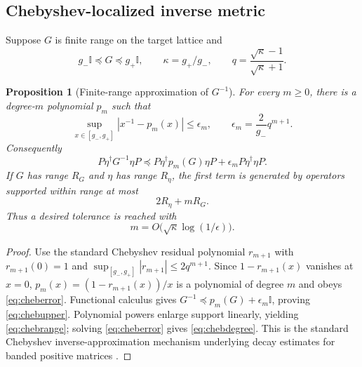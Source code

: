 \documentclass[11pt]{article}
\newtheorem{proposition}[theorem]{Proposition}
\theoremstyle{definition}
\theoremstyle{remark}
\newcommand{\Id}{\mathbb I}
\newcommand{\abs}[1]{\left\lvert #1\right\rvert}
\begin{document}
\subsection{Chebyshev-localized inverse metric}

Suppose $G$ is finite range on the target lattice and
\begin{equation}
 g_-\Id\preceq G\preceq g_+\Id,
 \qquad
 \kappa=g_+/g_-,
 \qquad
 q=\frac{\sqrt\kappa-1}{\sqrt\kappa+1}.
 \label{eq:kappaq}
\end{equation}

\begin{proposition}[Finite-range approximation of $G^{-1}$]
\label{prop:cheb}
For every $m\ge0$, there is a degree-$m$ polynomial $p_m$ such that
\begin{equation}
 \sup_{x\in[g_-,g_+]}
 \abs{x^{-1}-p_m(x)}
 \le\epsilon_m,
 \qquad
 \epsilon_m=\frac{2}{g_-}q^{m+1}.
 \label{eq:cheberror}
\end{equation}
Consequently
\begin{equation}
 \boxed{
 P\eta^\dagger G^{-1}\eta P
 \preceq
 P\eta^\dagger p_m(G)\eta P
 +\epsilon_mP\eta^\dagger\eta P.}
 \label{eq:chebupper}
\end{equation}
If $G$ has range $R_G$ and $\eta$ has range $R_\eta$, the first term is generated by operators supported within range at most
\begin{equation}
 2R_\eta+mR_G.
 \label{eq:chebrange}
\end{equation}
Thus a desired tolerance is reached with
\begin{equation}
 m=O\bigl(\sqrt\kappa\log(1/\epsilon)\bigr).
 \label{eq:chebdegree}
\end{equation}
\end{proposition}

\begin{proof}
Use the standard Chebyshev residual polynomial $r_{m+1}$ with $r_{m+1}(0)=1$ and
$\sup_{[g_-,g_+]}\abs{r_{m+1}}\le2q^{m+1}$.  Since $1-r_{m+1}(x)$ vanishes at $x=0$, $p_m(x)=(1-r_{m+1}(x))/x$ is a polynomial of degree $m$ and obeys \eqref{eq:cheberror}.  Functional calculus gives
$G^{-1}\preceq p_m(G)+\epsilon_m\Id$, proving \eqref{eq:chebupper}.  Polynomial powers enlarge support linearly, yielding \eqref{eq:chebrange}; solving \eqref{eq:cheberror} gives \eqref{eq:chebdegree}.  This is the standard Chebyshev inverse-approximation mechanism underlying decay estimates for banded positive matrices \cite{Saad,DemkoMossSmith}.
\end{proof}
\end{document}
